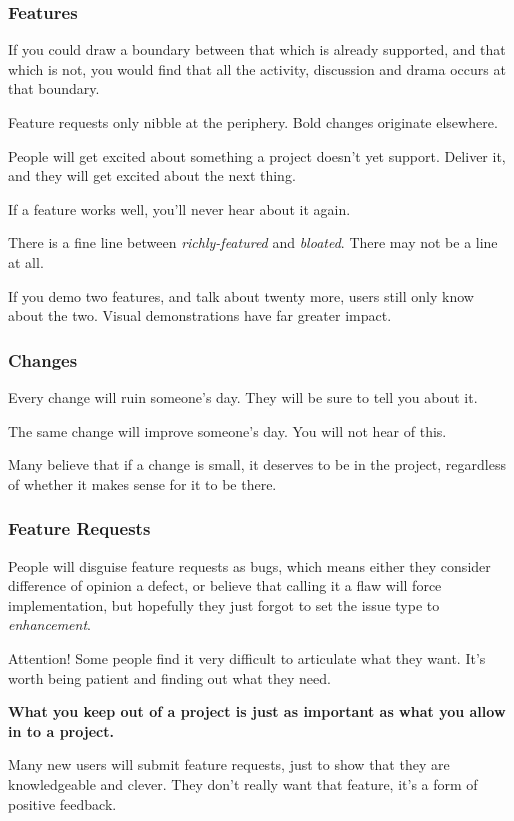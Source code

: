 \documentclass[t,handout]{beamer}
\begin{document}
\begin{frame}[fragile]\frametitle{Features}
    \vfill
    If you could draw a boundary between that which is already supported, and that which is not, you would find that all the activity, discussion and drama occurs at that boundary.

    Feature requests only nibble at the periphery. Bold changes originate elsewhere.

    People will get excited about something a project doesn't yet support. Deliver it, and they will get excited about the next thing.

    If a feature works well, you’ll never hear about it again.

    There is a fine line between \textit{richly-featured} and \textit{bloated}. There may not be a line at all.

    If you demo two features, and talk about twenty more, users still only know about the two. Visual demonstrations have far greater impact.
\end{frame}

\begin{frame}[fragile]\frametitle{Changes}
    \vfill
    Every change will ruin someone’s day. They will be sure to tell you about it.

    The same change will improve someone's day. You will not hear of this.

    Many believe that if a change is small, it deserves to be in the project, regardless of whether it makes sense for it to be there.
\end{frame}

\begin{frame}[fragile]\frametitle{Feature Requests}
    \vfill
    People will disguise feature requests as bugs, which means either they consider difference of opinion a defect, or believe that calling it a flaw will force implementation, but hopefully they just forgot to set the issue type to \textit{enhancement}.

    \begin{alertblock}{Attention!}
        Some people find it very difficult to articulate what they want. It's worth being patient and finding out what they need.
    \end{alertblock}

    \textbf{What you keep out of a project is just as important as what you allow in to a project.}

    Many new users will submit feature requests, just to show that they are knowledgeable and clever. They don't really want that feature, it's a form of positive feedback.
\end{frame}
\end{document}
